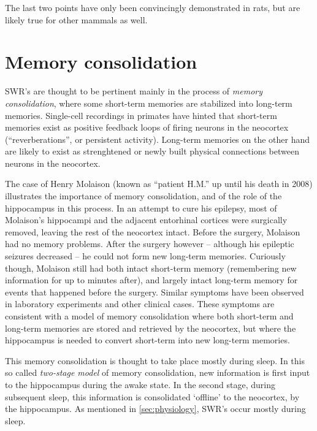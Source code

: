 The last two points have only been convincingly demonstrated in rats, but are likely true for other mammals as well.




\section{Memory consolidation}

SWR's are thought to be pertinent mainly in the process of \emph{memory consolidation}, where some short-term memories are stabilized into long-term memories. Single-cell recordings in primates have hinted that short-term memories exist as positive feedback loops of firing neurons in the neocortex (``reverberations'', or persistent activity). Long-term memories on the other hand are likely to exist as strenghtened or newly built physical connections between neurons in the neocortex. \cite{Kandel2013,Bear2015,Purves2017}

The case of Henry Molaison (known as ``patient H.M.'' up until his death in 2008) illustrates the importance of memory consolidation, and of the role of the hippocampus in this process. In an attempt to cure his epilepsy, most of Molaison's hippocampi and the adjacent entorhinal cortices were surgically removed, leaving the rest of the neocortex intact. Before the surgery, Molaison had no memory problems. After the surgery however -- although his epileptic seizures decreased -- he could not form new long-term memories.\footnotemark{} Curiously though, Molaison still had both intact short-term memory (remembering new information for up to minutes after), and largely intact long-term memory for events that happened before the surgery. Similar symptoms have been observed in laboratory experiments and other clinical cases. These symptoms are consistent with a model of memory consolidation where both short-term and long-term memories are stored and retrieved by the neocortex, but where the hippocampus is needed to convert short-term into new long-term memories. \cite{Kandel2013,Purves2017}


This memory consolidation is thought to take place mostly during sleep. In this so called \emph{two-stage model} of memory consolidation, new information is first input to the hippocampus during the awake state. In the second stage, during subsequent sleep, this information is consolidated `offline' to the neocortex, by the hippocampus. As mentioned in \cref{sec:physiology}, SWR's occur mostly during sleep.





